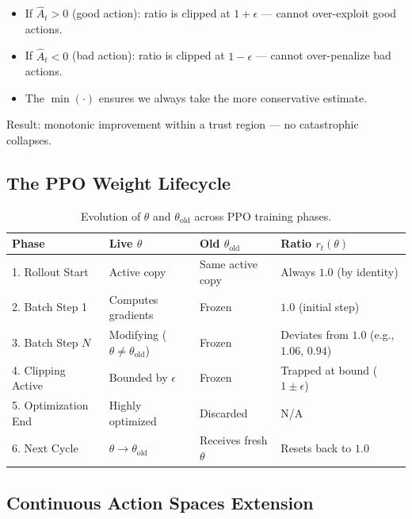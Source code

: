 \begin{intuitionbox}
\begin{itemize}
  \item If $\hat{A}_t > 0$ (good action): ratio is clipped at $1+\epsilon$ --- cannot over-exploit good actions.
  \item If $\hat{A}_t < 0$ (bad action): ratio is clipped at $1-\epsilon$ --- cannot over-penalize bad actions.
  \item The $\min(\cdot)$ ensures we always take the more conservative estimate.
\end{itemize}

Result: monotonic improvement within a trust region --- no catastrophic collapses.
\end{intuitionbox}

\subsection{The PPO Weight Lifecycle}
\label{the-ppo-weight-lifecycle}

\begin{table}[ht!]
\centering
\caption{Evolution of $\theta$ and $\theta_{\text{old}}$ across PPO training phases.}
\begin{tabular}{@{}lp{3.5cm}p{3.5cm}p{6cm}@{}}
\toprule
\textbf{Phase} & \textbf{Live $\theta$} & \textbf{Old $\theta_{\text{old}}$} & \textbf{Ratio $r_t(\theta)$} \\
\midrule
1. Rollout Start & Active copy & Same active copy & Always $1.0$ (by identity) \\
2. Batch Step 1 & Computes gradients & Frozen & $1.0$ (initial step) \\
3. Batch Step $N$ & Modifying ($\theta \neq \theta_{\text{old}}$) & Frozen & Deviates from $1.0$ (e.g., $1.06$, $0.94$) \\
4. Clipping Active & Bounded by $\epsilon$ & Frozen & Trapped at bound ($1 \pm \epsilon$) \\
5. Optimization End & Highly optimized & Discarded & N/A \\
6. Next Cycle & $\theta \rightarrow \theta_{\text{old}}$ & Receives fresh $\theta$ & Resets back to $1.0$ \\
\bottomrule
\end{tabular}
\end{table}

\subsection{Continuous Action Spaces Extension}
\label{continuous-action-spaces-extension}

